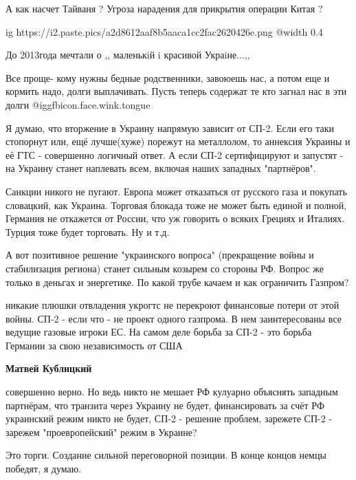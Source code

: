 \begin{itemize}
А как насчет Тайваня ? Угроза нарадения для прикрытия операции Китая ?


\ifcmt
  ig https://i2.paste.pics/a2d8612aaf8b5aaca1cc2fac2620426e.png
  @width 0.4
\fi

До 2013года мечтали о ,, маленькiй i красивой Украiне...,,


Все проще- кому нужны бедные родственники, завоюешь нас, а потом еще и кормить
надо, долги выплачивать. Пусть теперь содержат те кто загнал нас в эти долги @igg{fbicon.face.wink.tongue} 


Я думаю, что вторжение в Украину напрямую зависит от СП-2. Если его таки
стопорнут или, ещё лучше(хуже) порежут на металлолом, то аннексия Украины и её
ГТС - совершенно логичный ответ. А если СП-2 сертифицируют и запустят - на
Украину станет наплевать всем, включая наших западных "партнёров".

Санкции никого не пугают. Европа может отказаться от русского газа и покупать
словацкий, как Украина. Торговая блокада тоже не может быть единой и полной,
Германия не откажется от России, что уж говорить о всяких Грециях и Италиях.
Турция тоже будет торговать. Ну и т.д.

А вот позитивное решение "украинского вопроса" (прекращение войны и
стабилизация региона) станет сильным козырем со стороны РФ.  Вопрос же только в
деньгах и энергетике. По какой трубе качаем и как ограничить Газпром?

\begin{itemize} %

никакие плюшки отвладения укрогтс не перекроют финансовые потери от этой войны.
СП-2 - если что - не проект одного газпрома. В нем заинтересованы все ведущие
газовые игроки ЕС. На самом деле борьба за СП-2 - это борьба Германии за свою
независимость от США


\textbf{Матвей Кублицкий} 

совершенно верно. Но ведь никто не мешает РФ кулуарно объяснять западным
партнёрам, что транзита через Украину не будет, финансировать за счёт РФ
украинский режим никто не будет, СП-2 - решение проблем, зарежете СП-2 -
зарежем "проевропейский" режим в Украине?

Это торги. Создание сильной переговорной позиции. В конце концов немцы победят,
я думаю.



\end{itemize}
\end{itemize}

